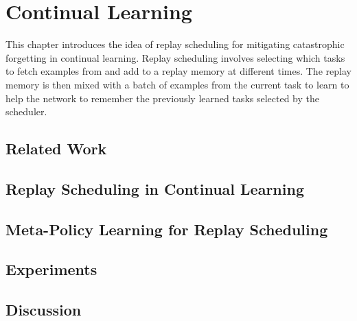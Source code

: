 
\chapter{Continual Learning}

This chapter introduces the idea of replay scheduling for mitigating catastrophic forgetting in continual learning. Replay scheduling involves selecting which tasks to fetch examples from and add to a replay memory at different times. The replay memory is then mixed with a batch of examples from the current task to learn to help the network to remember the previously learned tasks selected by the scheduler. 

\section{Related Work}
\section{Replay Scheduling in Continual Learning} 
\section{Meta-Policy Learning for Replay Scheduling}
\section{Experiments}
\section{Discussion}




